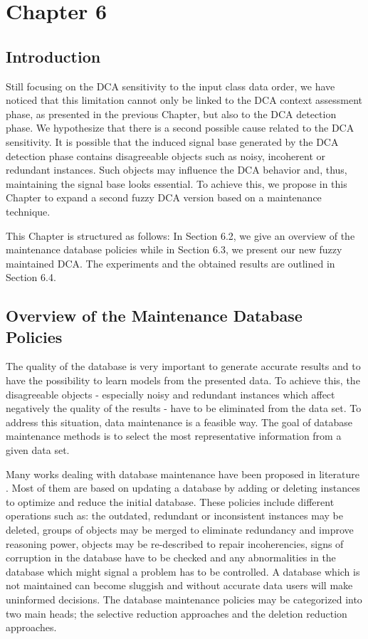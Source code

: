 \chapter{Chapter 6}
\section{Introduction}
Still focusing on the DCA sensitivity to the input class data order, we have noticed that this   limitation cannot only be linked to the DCA context assessment phase, as presented in the previous Chapter, but also  to the DCA detection phase. We hypothesize that there is a second possible cause related to the DCA sensitivity.  It is possible that the induced signal base generated by the DCA detection phase  contains disagreeable objects such as noisy, incoherent or redundant instances. Such objects may influence the DCA behavior and, thus, maintaining the   signal base looks essential. To achieve this, we propose in this Chapter  to expand a second fuzzy DCA version based on a maintenance technique. 

This Chapter is structured as follows: In Section 6.2, we give an overview of the maintenance database policies while in Section 6.3, we present  our new fuzzy maintained DCA. The experiments and the obtained results are outlined in Section 6.4.
\section{Overview of the Maintenance Database Policies}
The quality of the database is very important to generate accurate results and to have the possibility to learn models from the presented data.  To achieve this, the disagreeable objects - especially noisy and redundant instances which affect negatively the quality of the results - have to be eliminated from the data set. To address this situation, data maintenance is a feasible way. The goal of database maintenance methods is to select the most representative information from a given data set. 

Many works dealing with database maintenance have been proposed in literature \cite{D4}. Most of them are based on updating a database by adding or deleting instances to optimize and reduce the initial database. These policies include different operations such as:  the outdated, redundant or inconsistent instances may be deleted, groups of objects may be merged to eliminate redundancy and improve reasoning power, objects may be re-described to repair incoherencies, signs of corruption in the database have to be checked and any abnormalities in the database which might signal a problem has to be controlled. A database which is not maintained can become sluggish and without accurate data users will make uninformed decisions. The database maintenance policies may be categorized into two main heads; the selective reduction approaches and the deletion reduction approaches.



